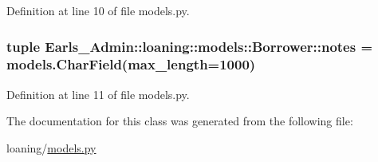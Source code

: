 Definition at line 10 of file models.py.\hypertarget{classEarls__Admin_1_1loaning_1_1models_1_1Borrower_30313365942be60eaa1f976e0c627b77}{
\subsubsection[notes]{\setlength{\rightskip}{0pt plus 5cm}tuple {\bf Earls\_\-Admin::loaning::models::Borrower::notes} = models.CharField(max\_\-length=1000)}}
\label{classEarls__Admin_1_1loaning_1_1models_1_1Borrower_30313365942be60eaa1f976e0c627b77}




Definition at line 11 of file models.py.

The documentation for this class was generated from the following file:\begin{CompactItemize}
\item 
loaning/\hyperlink{loaning_2models_8py}{models.py}\end{CompactItemize}
